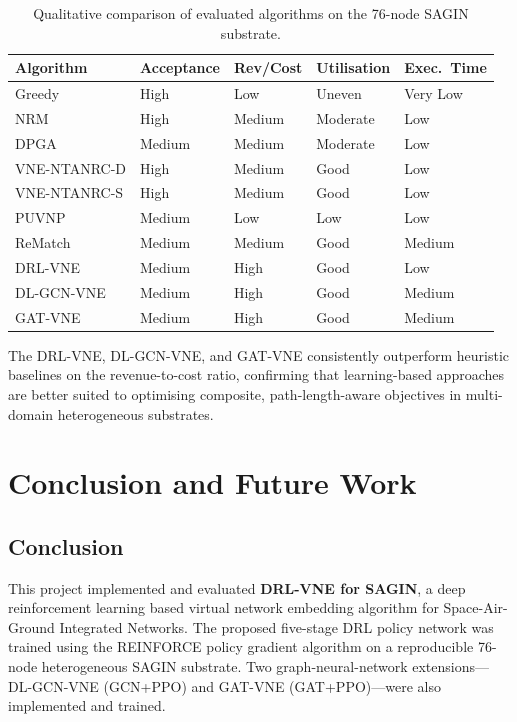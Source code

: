 \documentclass[12pt,a4paper]{report}
\begin{document}
\begin{table}[H]
\centering
\renewcommand{\arraystretch}{1.5}
\begin{tabularx}{\textwidth}{|l|X|X|X|X|}
\hline
\textbf{Algorithm} & \textbf{Acceptance} & \textbf{Rev/Cost} & \textbf{Utilisation} & \textbf{Exec.\ Time} \\
\hline
Greedy          & High   & Low    & Uneven   & Very Low \\
NRM             & High   & Medium & Moderate & Low \\
DPGA            & Medium & Medium & Moderate & Low \\
VNE-NTANRC-D    & High   & Medium & Good     & Low \\
VNE-NTANRC-S    & High   & Medium & Good     & Low \\
PUVNP           & Medium & Low    & Low      & Low \\
ReMatch         & Medium & Medium & Good     & Medium \\
DRL-VNE         & Medium & High   & Good     & Low \\
DL-GCN-VNE      & Medium & High   & Good     & Medium \\
GAT-VNE         & Medium & High   & Good     & Medium \\
\hline
\end{tabularx}
\caption{Qualitative comparison of evaluated algorithms on the 76-node SAGIN substrate.}
\label{tab:results-summary}
\end{table}

The DRL-VNE, DL-GCN-VNE, and GAT-VNE consistently outperform heuristic baselines on the
revenue-to-cost ratio, confirming that learning-based approaches are better suited to
optimising composite, path-length-aware objectives in multi-domain heterogeneous substrates.

\chapter{Conclusion and Future Work}
\label{ch:conclusion}

\section{Conclusion}

This project implemented and evaluated \textbf{DRL-VNE for SAGIN}, a deep reinforcement
learning based virtual network embedding algorithm for Space-Air-Ground Integrated Networks.
The proposed five-stage DRL policy network was trained using the REINFORCE policy gradient
algorithm on a reproducible 76-node heterogeneous SAGIN substrate. Two graph-neural-network
extensions---DL-GCN-VNE (GCN+PPO) and GAT-VNE (GAT+PPO)---were also implemented and trained.
\end{document}
